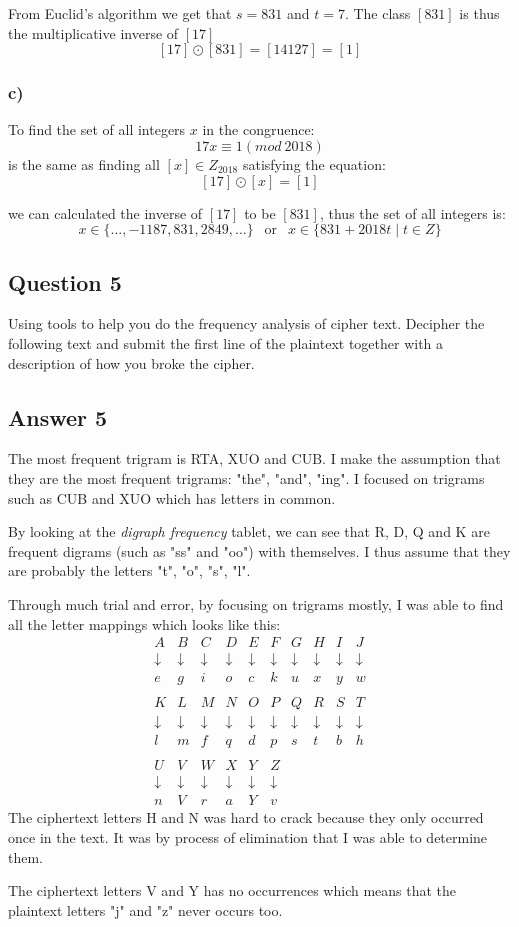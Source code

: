 \documentclass{article}
\begin{document}
	From Euclid's algorithm we get that $s = 831$ and $t=7$. The class $[831]$ is thus the multiplicative inverse of $[17]$ 
	$$
	[17] \odot [831] = [14127] = [1]
	$$
	
	\subsubsection*{c)}
	To find the set of all integers $x$ in the congruence:
	$$
	17x \equiv 1 (mod \ 2018)
	$$
	is the same as finding all $[x] \in Z_{2018}$ satisfying the equation:
	$$
	[17] \odot [x] = [1]
	$$
	
	we can calculated the inverse of $[17]$ to be $[831]$, thus the set of all integers is:
	$$
	x \in \{...,-1187,831,2849,...\} \ \ \text{ or } \ \ x \in \{831+2018t \mid t \in Z\}
	$$
	
	\subsection*{Question 5}
	Using tools to help you do the frequency analysis of cipher text. Decipher the following text and submit the first line of the plaintext together with a description of how you broke the cipher.
	
	\subsection*{Answer 5} 
	The most frequent trigram is RTA, XUO and CUB. I make the assumption that they are the most frequent trigrams: "the", "and", "ing". I focused on trigrams such as CUB and XUO which has letters in common.
	
	By looking at the \textit{digraph frequency} tablet, we can see that R, D, Q and K are frequent digrams (such as "ss" and "oo")  with themselves. I thus assume that they are probably the letters "t", "o", "s", "l".
	
	Through much trial and error, by focusing on trigrams mostly, I was able to find all the letter mappings which looks like this:
	\[
	\begin{matrix}
	A&B&C&D&E&F&G&H&I&J \\ 
	\downarrow&\downarrow&\downarrow&\downarrow&\downarrow&\downarrow&\downarrow&\downarrow&\downarrow&\downarrow \\
	e&g&i&o&c&k&u&x&y&w \\ \\
	K&L&M&N&O&P&Q&R&S&T \\ 
	\downarrow&\downarrow&\downarrow&\downarrow&\downarrow&\downarrow&\downarrow&\downarrow&\downarrow&\downarrow \\
	l&m&f&q&d&p&s&t&b&h \\ \\
	U&V&W&X&Y&Z \\
	\downarrow&\downarrow&\downarrow&\downarrow&\downarrow&\downarrow \\
	n&V&r&a&Y&v 
	\end{matrix}
	\]
	The ciphertext letters H and N was hard to crack because they only occurred once in the text. It was by process of elimination that I was able to determine them.
	
	The ciphertext letters V and Y has no occurrences which means that the plaintext letters "j" and "z" never occurs too.
	
\end{document}
